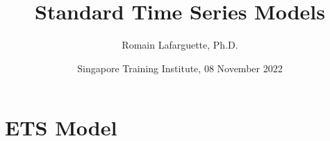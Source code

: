 \documentclass{beamer}
\title[Standard Models]{Standard Time Series Models}
\author[R. Lafarguette]{Romain Lafarguette, Ph.D.}
\institute[IMF]{ADIA Quant \& IMF External Consultant}
\date[STI, 08 Nov 2022]{Singapore Training Institute, 08 November 2022}
\begin{document}
\begin{frame}
\maketitle
\end{frame}


  






\section{ETS Model}






\end{document}
